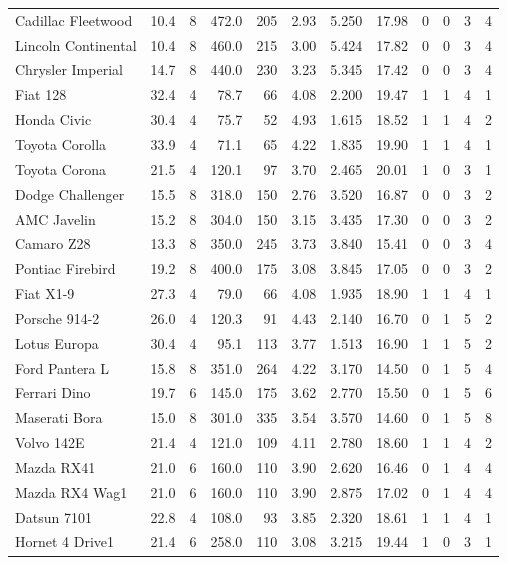 \documentclass[table]{article}
\begin{document}
\begin{longtable}{lrrrrrrrrrrr}
Cadillac Fleetwood & 10.4 & 8 & 472.0 & 205 & 2.93 & 5.250 & 17.98 & 0 & 0 & 3 & 4\\
\addlinespace
Lincoln Continental & 10.4 & 8 & 460.0 & 215 & 3.00 & 5.424 & 17.82 & 0 & 0 & 3 & 4\\
Chrysler Imperial & 14.7 & 8 & 440.0 & 230 & 3.23 & 5.345 & 17.42 & 0 & 0 & 3 & 4\\
Fiat 128 & 32.4 & 4 & 78.7 & 66 & 4.08 & 2.200 & 19.47 & 1 & 1 & 4 & 1\\
Honda Civic & 30.4 & 4 & 75.7 & 52 & 4.93 & 1.615 & 18.52 & 1 & 1 & 4 & 2\\
Toyota Corolla & 33.9 & 4 & 71.1 & 65 & 4.22 & 1.835 & 19.90 & 1 & 1 & 4 & 1\\
\addlinespace
Toyota Corona & 21.5 & 4 & 120.1 & 97 & 3.70 & 2.465 & 20.01 & 1 & 0 & 3 & 1\\
Dodge Challenger & 15.5 & 8 & 318.0 & 150 & 2.76 & 3.520 & 16.87 & 0 & 0 & 3 & 2\\
AMC Javelin & 15.2 & 8 & 304.0 & 150 & 3.15 & 3.435 & 17.30 & 0 & 0 & 3 & 2\\
Camaro Z28 & 13.3 & 8 & 350.0 & 245 & 3.73 & 3.840 & 15.41 & 0 & 0 & 3 & 4\\
Pontiac Firebird & 19.2 & 8 & 400.0 & 175 & 3.08 & 3.845 & 17.05 & 0 & 0 & 3 & 2\\
\addlinespace
Fiat X1-9 & 27.3 & 4 & 79.0 & 66 & 4.08 & 1.935 & 18.90 & 1 & 1 & 4 & 1\\
Porsche 914-2 & 26.0 & 4 & 120.3 & 91 & 4.43 & 2.140 & 16.70 & 0 & 1 & 5 & 2\\
Lotus Europa & 30.4 & 4 & 95.1 & 113 & 3.77 & 1.513 & 16.90 & 1 & 1 & 5 & 2\\
Ford Pantera L & 15.8 & 8 & 351.0 & 264 & 4.22 & 3.170 & 14.50 & 0 & 1 & 5 & 4\\
Ferrari Dino & 19.7 & 6 & 145.0 & 175 & 3.62 & 2.770 & 15.50 & 0 & 1 & 5 & 6\\
\addlinespace
Maserati Bora & 15.0 & 8 & 301.0 & 335 & 3.54 & 3.570 & 14.60 & 0 & 1 & 5 & 8\\
Volvo 142E & 21.4 & 4 & 121.0 & 109 & 4.11 & 2.780 & 18.60 & 1 & 1 & 4 & 2\\
Mazda RX41 & 21.0 & 6 & 160.0 & 110 & 3.90 & 2.620 & 16.46 & 0 & 1 & 4 & 4\\
Mazda RX4 Wag1 & 21.0 & 6 & 160.0 & 110 & 3.90 & 2.875 & 17.02 & 0 & 1 & 4 & 4\\
Datsun 7101 & 22.8 & 4 & 108.0 & 93 & 3.85 & 2.320 & 18.61 & 1 & 1 & 4 & 1\\
\addlinespace
Hornet 4 Drive1 & 21.4 & 6 & 258.0 & 110 & 3.08 & 3.215 & 19.44 & 1 & 0 & 3 & 1\\

\end{longtable}
\end{document}
